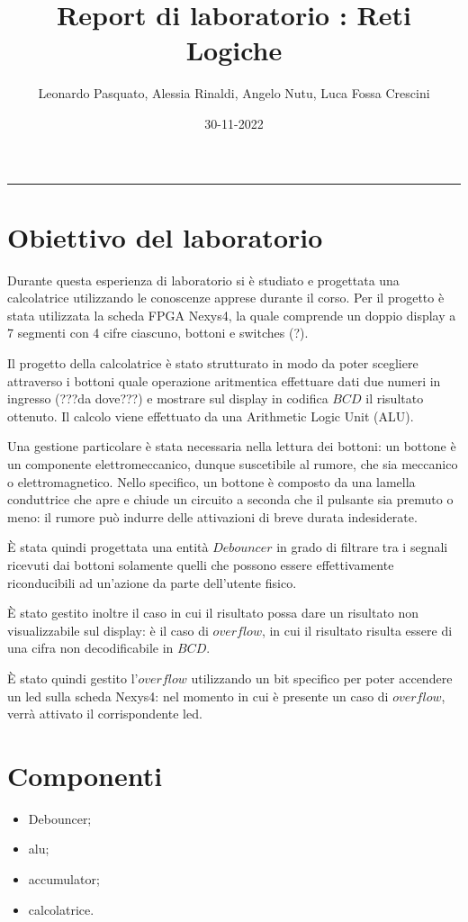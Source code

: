 \documentclass{article}
\title{\huge Report di laboratorio : Reti Logiche}
\author{Leonardo Pasquato, Alessia Rinaldi, Angelo Nutu, Luca Fossa Crescini}
\date{30-11-2022}
\begin{document}
    \maketitle
    \rule{\linewidth}{0.1mm}

    \section{Obiettivo del laboratorio}
    Durante questa esperienza di laboratorio si è studiato e progettata una calcolatrice utilizzando 
    le conoscenze apprese durante il corso.
    Per il progetto è stata utilizzata la scheda FPGA Nexys4, la quale comprende un doppio display
    a 7 segmenti con 4 cifre ciascuno, bottoni e switches (?).\par
    Il progetto della calcolatrice è stato strutturato in modo da poter scegliere attraverso i bottoni quale
    operazione aritmentica effettuare dati due numeri in ingresso (???da dove???) e mostrare sul display
    in codifica $BCD$ il risultato ottenuto. Il calcolo viene effettuato da una Arithmetic Logic Unit (ALU). \par
    Una gestione particolare è stata necessaria nella lettura dei bottoni: un bottone è un componente elettromeccanico, 
    dunque suscetibile al rumore, che sia meccanico o elettromagnetico. Nello specifico, un bottone è composto
    da una lamella conduttrice che apre e chiude un circuito a seconda che il pulsante sia premuto o meno: il rumore può 
    indurre delle attivazioni di breve durata indesiderate. \par
    È stata quindi progettata una entità $Debouncer$ in grado di filtrare tra i segnali ricevuti dai bottoni solamente 
    quelli che possono essere effettivamente riconducibili ad un'azione da parte dell'utente fisico.\par
    È stato gestito inoltre il caso in cui il risultato possa dare un risultato non visualizzabile sul display: è il caso di 
    $overflow$, in cui il risultato risulta essere di una cifra non decodificabile in $BCD$. \par
    È stato quindi gestito l'$overflow$ utilizzando un bit specifico per poter accendere un led sulla scheda 
    Nexys4: nel momento in cui è presente un caso di $overflow$, verrà attivato il corrispondente led. \par

    \section{Componenti}
    \begin{itemize}
        \item Debouncer;
        \item alu;
        \item accumulator;
        \item calcolatrice.
    \end{itemize}
    
\end{document}
